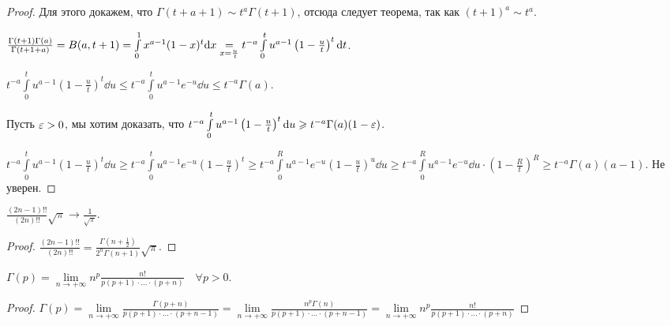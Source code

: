 \begin{proof}
    Для этого докажем, что $\Gamma(t+a+1) \sim t^{a} \Gamma(t+1)$, отсюда следует теорема, так как $(t+1)^{a} \sim t^a$.

    $\frac{\Gamma(t+1)\Gamma(a)}{\Gamma(t+1+a)} = B(a, t+1) = \int\limits_{0}^{1} x^{a - 1}(1-x)^t \mathrm{d}x \underset{x = \frac{u}{t}}{=} t^{-a}\int\limits_{0}^{t} u^{a - 1}\left( 1 - \frac{u}{t} \right)^{t} \mathrm{d}t$.

    $t^{-a} \int\limits_{0}^{t} u^{a - 1}\left( 1 - \frac{u}{t} \right)^{t} \dd{u} \le t^{-a} \int\limits_{0}^{t} u^{a-1}e^{-u}\dd{u} \le t^{-a} \Gamma(a)$.

    Пусть $\varepsilon > 0$, мы хотим доказать, что  $t^{-a} \int\limits_0^{t}u^{a-1}\left( 1 - \frac{u}{t} \right)^{t}\mathrm{d}u \geqslant t^{-a} \Gamma(a) (1-\varepsilon)$.

    $t^{-a} \int\limits_{0}^{t} u^{a - 1}\left( 1-\frac{u}{t} \right)^{t} \dd{u} \ge  t^{-a} \int\limits_{0}^{t}u^{a-1}e^{-u} \left( 1-\frac{u}{t} \right)^{t} \ge  t^{-a} \int\limits_{0}^{R}u^{a-1}e^{-u} \left( 1-\frac{u}{t} \right)^{u} \dd{u} \ge  t^{-a} \int\limits_{0}^{R} u^{a - 1}e^{-u} \dd{u} \cdot \left( 1-\frac{R}{t} \right)^{R} \ge  t^{-a}\Gamma(a) (a-1)$. Не уверен.
\end{proof}
\begin{consequence}
    $\frac{(2n-1)!!}{(2n)!!} \sqrt{\pi} \to \frac{1}{\sqrt{\pi}}$.
\end{consequence}
\begin{proof}
    $\frac{(2n-1)!!}{(2n)!!} = \frac{\Gamma(n+\frac{1}{2})}{2^n\Gamma(n+1)} \sqrt{\pi}$.
\end{proof}
\begin{consequence}
    $\Gamma(p) = \lim\limits_{n \to +\infty} n^p \frac{n!}{p(p+1) \cdot \ldots \cdot (p+n)}\quad \forall p > 0$.
\end{consequence}
\begin{proof}
    $\Gamma(p) = \lim\limits_{n \to +\infty} \frac{\Gamma(p+n)}{p(p+1) \cdot \ldots \cdot (p+n-1)} = \lim\limits_{n \to +\infty} \frac{n^p \Gamma(n)}{p(p+1) \cdot \ldots \cdot (p+n-1)} = \lim\limits_{n \to +\infty} n^p \frac{n!}{p (p+1) \cdot \ldots \cdot (p+n)}$
\end{proof}

